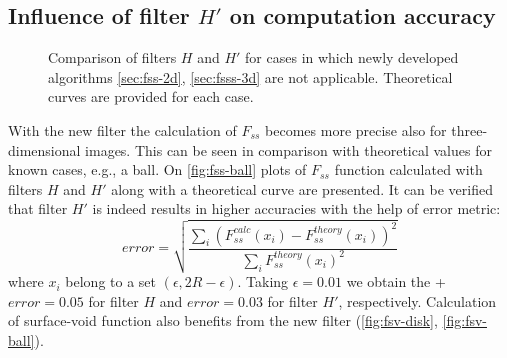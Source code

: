 \documentclass[preprint]{elsarticle}
\begin{document}
\subsection{Influence of filter $H'$ on computation accuracy}
\label{sec:influence}
\begin{figure}
  \centering
  \hfill
  \hfill
  \caption[]{Comparison of filters $H$ and $H'$ for cases in which newly
    developed algorithms \cref{sec:fss-2d}, \cref{sec:fsss-3d} are not
    applicable. Theoretical curves are provided for each case.}
  \label{fig:not-covered}
\end{figure}
With the new filter the calculation of $F_{ss}$ becomes more precise also for
three-dimensional images. This can be seen in comparison with theoretical values
for known cases, e.g., a ball. On \cref{fig:fss-ball} plots
of $F_{ss}$ function calculated with filters $H$ and $H'$ along with a
theoretical curve are presented. It can be verified that filter $H'$ is indeed results 
in higher accuracies with the help of error metric:
\begin{equation}
  error = \sqrt{\frac{\sum_i (F_{ss}^{calc}(x_i) -
      F_{ss}^{theory}(x_i))^2}{\sum_i F_{ss}^{theory}(x_i)^2}}
  \label{eq:error}
\end{equation}
where $x_i$ belong to a set $(\epsilon, 2R - \epsilon)$. Taking
$\epsilon = 0.01$ we obtain the +$error = 0.05$ for filter $H$ and $error = 0.03$ for
filter $H'$, respectively. Calculation of surface-void function also benefits from the new
filter (\cref{fig:fsv-disk}, \cref{fig:fsv-ball}).
\end{document}
